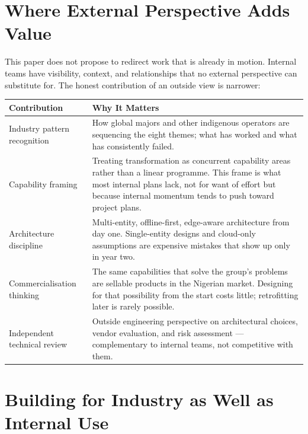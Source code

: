\documentclass[10pt]{article}
\newcommand{\spacer}{\vspace{10pt}}
\newcommand{\bigspacer}{\vspace{16pt}}
\begin{document}
\bigspacer

\section{Where External Perspective Adds Value}

This paper does not propose to redirect work that is already in motion.
Internal teams have visibility, context, and relationships that no external
perspective can substitute for. The honest contribution of an outside view is
narrower:

\spacer
\small
\begin{tabularx}{\columnwidth}{@{}lX@{}}
\toprule
\textbf{Contribution} & \textbf{Why It Matters} \\
\midrule
Industry pattern recognition
  & How global majors and other indigenous operators are sequencing the
    eight themes; what has worked and what has consistently failed. \\
Capability framing
  & Treating transformation as concurrent capability areas rather than a
    linear programme. This frame is what most internal plans lack, not for
    want of effort but because internal momentum tends to push toward
    project plans. \\
Architecture discipline
  & Multi-entity, offline-first, edge-aware architecture from day one.
    Single-entity designs and cloud-only assumptions are expensive
    mistakes that show up only in year two. \\
Commercialisation thinking
  & The same capabilities that solve the group's problems are sellable
    products in the Nigerian market. Designing for that possibility from
    the start costs little; retrofitting later is rarely possible. \\
Independent technical review
  & Outside engineering perspective on architectural choices, vendor
    evaluation, and risk assessment --- complementary to internal teams,
    not competitive with them. \\
\bottomrule
\end{tabularx}
\normalsize

\bigspacer

\section{Building for Industry as Well as Internal Use}
\end{document}
